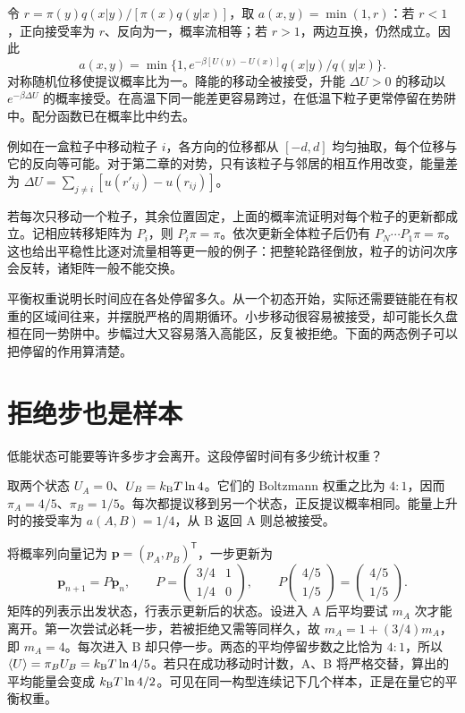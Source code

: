 令 $r=\pi(y)q(x|y)/[\pi(x)q(y|x)]$，取 $a(x,y)=\min(1,r)$：若 $r<1$，正向接受率为 $r$、反向为一，概率流相等；若 $r>1$，两边互换，仍然成立。因此
\begin{equation}
a(x,y)=\min\{1,e^{-\beta[U(y)-U(x)]}q(x|y)/q(y|x)\}.
\end{equation}
对称随机位移使提议概率比为一。降能的移动全被接受，升能 $\Delta U>0$ 的移动以 $e^{-\beta\Delta U}$ 的概率接受。在高温下同一能差更容易跨过，在低温下粒子更常停留在势阱中。配分函数已在概率比中约去。

例如在一盒粒子中移动粒子 $i$，各方向的位移都从 $[-d,d]$ 均匀抽取，每个位移与它的反向等可能。对于第二章的对势，只有该粒子与邻居的相互作用改变，能量差为 $\Delta U=\sum_{j\ne i}[u(r'_{ij})-u(r_{ij})]$。

若每次只移动一个粒子，其余位置固定，上面的概率流证明对每个粒子的更新都成立。记相应转移矩阵为 $P_i$，则 $P_i\pi=\pi$。依次更新全体粒子后仍有 $P_N\cdots P_1\pi=\pi$。这也给出平稳性比逐对流量相等更一般的例子：把整轮路径倒放，粒子的访问次序会反转，诸矩阵一般不能交换。

平衡权重说明长时间应在各处停留多久。从一个初态开始，实际还需要链能在有权重的区域间往来，并摆脱严格的周期循环。小步移动很容易被接受，却可能长久盘桓在同一势阱中。步幅过大又容易落入高能区，反复被拒绝。下面的两态例子可以把停留的作用算清楚。

\section{拒绝步也是样本}
低能状态可能要等许多步才会离开。这段停留时间有多少统计权重？

取两个状态 $U_A=0$、$U_B=k_{\mathrm B} T\ln4$。它们的 Boltzmann 权重之比为 $4:1$，因而 $\pi_A=4/5$、$\pi_B=1/5$。每次都提议移到另一个状态，正反提议概率相同。能量上升时的接受率为 $a(A,B)=1/4$，从 B 返回 A 则总被接受。

将概率列向量记为 $\bm p=(p_A,p_B)^{\mathsf T}$，一步更新为
\begin{equation}\label{mc:two-state}
\bm p_{n+1}=P\bm p_n,\qquad
P=\begin{pmatrix}3/4&1\\1/4&0\end{pmatrix},\qquad
P\begin{pmatrix}4/5\\1/5\end{pmatrix}=\begin{pmatrix}4/5\\1/5\end{pmatrix}.
\end{equation}
矩阵的列表示出发状态，行表示更新后的状态。设进入 A 后平均要试 $m_A$ 次才能离开。第一次尝试必耗一步，若被拒绝又需等同样久，故 $m_A=1+(3/4)m_A$，即 $m_A=4$。每次进入 B 却只停一步。两态的平均停留步数之比恰为 $4:1$，所以 $\langle U\rangle=\pi_B U_B=k_{\mathrm B} T\ln4/5$。若只在成功移动时计数，A、B 将严格交替，算出的平均能量会变成 $k_{\mathrm B} T\ln4/2$。可见在同一构型连续记下几个样本，正是在量它的平衡权重。

